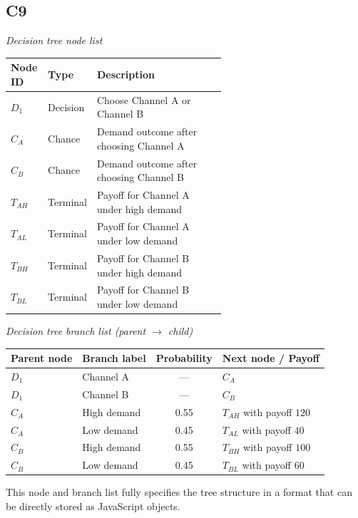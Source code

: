 \begin{ExamProblems}
		\subsection*{C9}
		\begin{center}
			\textit{Decision tree node list} \\
			\begin{tabular}{l l p{0.6\linewidth}}
				\toprule
				Node ID & Type & Description \\
				\midrule
				$D_1$ & Decision & Choose Channel A or Channel B \\
				$C_A$ & Chance & Demand outcome after choosing Channel A \\
				$C_B$ & Chance & Demand outcome after choosing Channel B \\
				$T_{AH}$ & Terminal & Payoff for Channel A under high demand \\
				$T_{AL}$ & Terminal & Payoff for Channel A under low demand \\
				$T_{BH}$ & Terminal & Payoff for Channel B under high demand \\
				$T_{BL}$ & Terminal & Payoff for Channel B under low demand \\
				\bottomrule
			\end{tabular}
		\end{center}
		
		\begin{center}
			\textit{Decision tree branch list (parent $\rightarrow$ child)} \\
			\begin{tabular}{l l c l}
				\toprule
				Parent node & Branch label & Probability & Next node / Payoff \\
				\midrule
				$D_1$ & Channel A & --- & $C_A$ \\
				$D_1$ & Channel B & --- & $C_B$ \\
				$C_A$ & High demand & 0.55 & $T_{AH}$ with payoff $120$ \\
				$C_A$ & Low demand & 0.45 & $T_{AL}$ with payoff $40$ \\
				$C_B$ & High demand & 0.55 & $T_{BH}$ with payoff $100$ \\
				$C_B$ & Low demand & 0.45 & $T_{BL}$ with payoff $60$ \\
				\bottomrule
			\end{tabular}
		\end{center}
		This node and branch list fully specifies the tree structure in a format that can be directly stored as JavaScript objects.
		

\end{ExamProblems}
